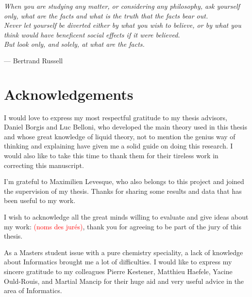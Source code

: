 
\begin{flushright}
\textsl{When you are studying any matter, or considering any philosophy,
ask yourself only, what are the facts and what is the truth that the
facts bear out.}\\
\textsl{ Never let yourself be diverted either by what you wish to
believe, or by what you think would have beneficent social effects
if it were believed.}\\
\textsl{ But look only, and solely, at what are the facts.}
\par\end{flushright}

\begin{flushright}
--- Bertrand Russell 
\par\end{flushright}

\bigskip{}


\begingroup
\let\clearpage\relax
\let\cleardoublepage\relax 


\chapter*{Acknowledgements}

I would love to express my most respectful gratitude to my thesis
advisors, Daniel Borgis and Luc Belloni, who developed the main theory
used in this thesis and whose great knowledge of liquid theory, not to mention the genius way of thinking and explaining have given me a
solid guide on doing this research. I would also like to take this time to thank them
for their tireless work in correcting this manuscript.

I'm grateful to Maximilien Levesque, who also belongs to this
project and joined the supervision of my thesis. Thanks for sharing
some results and data that has been useful to my work.

I wish to acknowledge all the great minds willing to evaluate
and give ideas about my work: \textcolor{red}{(noms des jurés)}, thank
you for agreeing to be part of the jury of this thesis.

As a Masters student issue with a pure chemistry speciality, a lack
of knowledge about Informatics brought me a lot of difficulties. I
would like to express my sincere gratitude to my colleagues Pierre
Kestener, Matthieu Haefele, Yacine Ould-Rouis, and Martial Mancip
for their huge aid and very useful advice in the area of Informatics.

